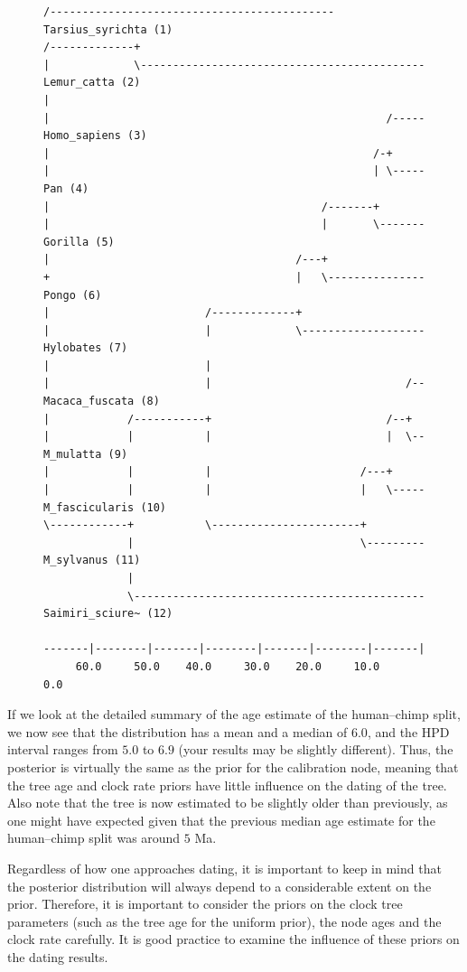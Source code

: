 \documentclass[12pt]{book}
\begin{document}
\begin{figure}[h]
\centering
\begin{BVerbatim}[fontsize=\scriptsize]
              /-------------------------------------------- Tarsius_syrichta (1)
/-------------+
|             \-------------------------------------------- Lemur_catta (2)
|
|                                                    /----- Homo_sapiens (3)
|                                                  /-+
|                                                  | \----- Pan (4)
|                                          /-------+
|                                          |       \------- Gorilla (5)
|                                      /---+
+                                      |   \--------------- Pongo (6)
|                        /-------------+
|                        |             \------------------- Hylobates (7)
|                        |
|                        |                              /-- Macaca_fuscata (8)
|            /-----------+                           /--+
|            |           |                           |  \-- M_mulatta (9)
|            |           |                       /---+
|            |           |                       |   \----- M_fascicularis (10)
\------------+           \-----------------------+
             |                                   \--------- M_sylvanus (11)
             |
             \--------------------------------------------- Saimiri_sciure~ (12)

-------|--------|-------|--------|-------|--------|-------|
     60.0     50.0    40.0     30.0    20.0     10.0     0.0
\end{BVerbatim}
\end{figure}

If we look at the detailed summary of the age estimate of the human--chimp split, we now see that
the distribution has a mean and a median of $6.0$, and the HPD interval ranges from $5.0$ to $6.9$
(your results may be slightly different). Thus, the posterior is virtually the same as the prior
for the calibration node, meaning that the tree age and clock rate priors have little influence on
the dating of the tree. Also note that the tree is now estimated to be slightly older than
previously, as one might have expected given that the previous median age estimate for the
human--chimp split was around $5$ Ma.

Regardless of how one approaches dating, it is important to keep in mind that the posterior
distribution will always depend to a considerable extent on the prior. Therefore, it is important
to consider the priors on the clock tree parameters (such as the tree age for the uniform prior),
the node ages and the clock rate carefully. It is good practice to examine the influence of these
priors on the dating results.
\vspace{1cm}
\end{document}
